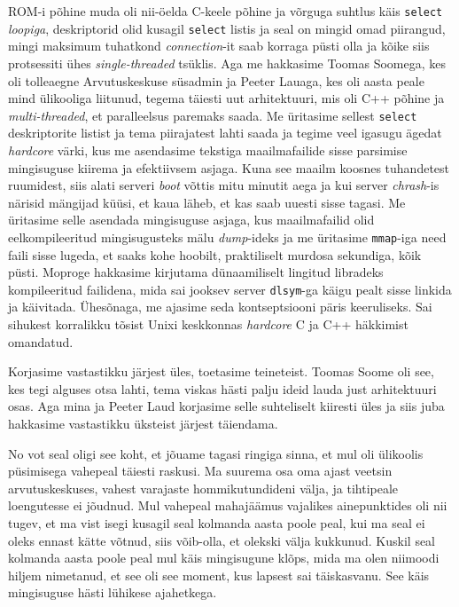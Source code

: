 ROM-i põhine muda oli nii-öelda C-keele põhine  ja võrguga suhtlus 
käis \verb|select| \emph{loopiga}, deskriptorid olid kusagil \verb|select| 
listis ja seal on mingid omad piirangud, mingi maksimum tuhatkond 
\emph{connection}-it saab korraga püsti olla ja kõike siis  protsessiti ühes 
\emph{single-threaded} tsüklis. Aga me hakkasime Toomas 
Soomega, kes oli tolleaegne Arvutuskeskuse süsadmin 
ja Peeter Lauaga, kes oli  aasta peale mind ülikooliga 
liitunud, tegema täiesti uut arhitektuuri, mis oli C++ põhine 
ja \emph{multi-threaded}, et paralleelsus paremaks saada. Me üritasime sellest 
\verb|select| deskriptorite listist ja tema piirajatest lahti saada ja 
tegime veel igasugu ägedat \emph{hardcore} värki, kus me asendasime tekstiga 
maailmafailide sisse parsimise mingisuguse kiirema ja efektiivsem asjaga. Kuna 
see maailm koosnes tuhandetest ruumidest, siis alati serveri \emph{boot} võttis 
mitu minutit aega ja kui server \emph{chrash}-is närisid mängijad küüsi, et 
kaua läheb, et kas saab uuesti sisse tagasi. Me üritasime selle asendada 
mingisuguse asjaga, kus  maailmafailid olid eelkompileeritud mingisugusteks 
mälu \emph{dump}-ideks ja me üritasime \verb|mmap|-iga need faili  sisse 
lugeda, et saaks kohe hoobilt, praktiliselt murdosa sekundiga, kõik püsti. 
Moproge hakkasime kirjutama dünaamiliselt lingitud libradeks kompileeritud 
failidena, mida sai jooksev server \verb|dlsym|-ga käigu pealt sisse linkida ja 
käivitada. Ühesõnaga, me ajasime seda kontseptsiooni päris keeruliseks. Sai 
sihukest korralikku tõsist Unixi keskkonnas \emph{hardcore} C ja C++ häkkimist 
omandatud. 


Korjasime  vastastikku järjest üles, toetasime teineteist. Toomas 
Soome oli see, kes tegi alguses otsa lahti, tema 
viskas hästi palju ideid  lauda just arhitektuuri osas. Aga  mina 
ja Peeter Laud korjasime selle suhteliselt kiiresti 
üles ja siis juba hakkasime vastastikku üksteist järjest täiendama. 


No vot seal oligi see koht, et jõuame tagasi ringiga sinna, et mul oli  
ülikoolis püsimisega vahepeal täiesti raskusi. Ma suurema osa oma ajast veetsin 
arvutuskeskuses, vahest  varajaste hommikutundideni välja, ja tihtipeale  
loengutesse ei jõudnud. Mul vahepeal mahajäämus vajalikes ainepunktides oli nii 
tugev, et ma vist isegi kusagil seal kolmanda aasta poole  peal, kui ma 
seal ei oleks ennast kätte võtnud, siis võib-olla, et olekski välja kukkunud. 
Kuskil seal kolmanda aasta poole peal mul käis mingisugune klõps, mida ma olen 
niimoodi hiljem nimetanud, et see oli see moment, kus lapsest sai täiskasvanu. 
See käis mingisuguse hästi lühikese ajahetkega. 

